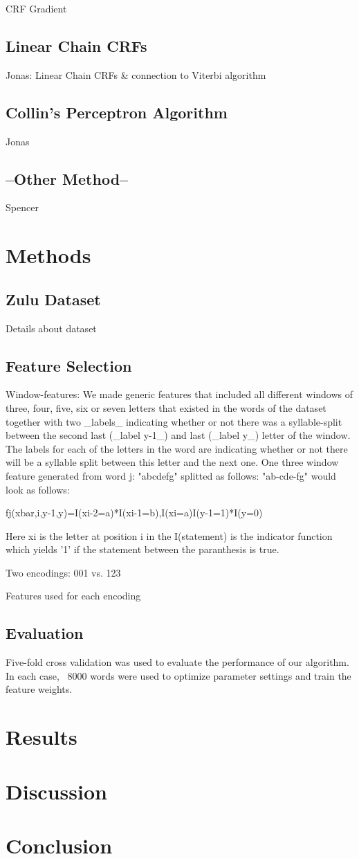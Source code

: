 \documentclass[10pt,twocolumn,letterpaper]{article}
\begin{document}
CRF Gradient

\subsection{Linear Chain CRFs}
Jonas: Linear Chain CRFs \& connection to Viterbi algorithm
\subsection{Collin's Perceptron Algorithm}
Jonas
\subsection{--Other Method--}
Spencer

\section{Methods}
\subsection{Zulu Dataset}
Details about dataset

\subsection{Feature Selection}
Window-features:
We made generic features that included all different windows of three, four, five, six or seven letters that existed in the words of the dataset together with two _labels_ indicating whether or not there was a syllable-split between the second last (_label y-1_) and last (_label y_) letter of the window. The labels for each of the letters in the word are indicating whether or not there will be a syllable split between this letter and the next one. One three window feature generated from word j: "abcdefg" splitted as follows: "ab-cde-fg" would look as follows:

fj(xbar,i,y-1,y)=I(xi-2=a)*I(xi-1=b),I(xi=a)I(y-1=1)*I(y=0)

Here xi is the letter at position i in the I(statement) is the indicator function which yields '1' if the statement between the paranthesis is true.


Two encodings: 001 vs. 123

Features used for each encoding

\subsection{Evaluation}
Five-fold cross validation was used to evaluate the performance of our algorithm.  In each case, ~8000 words were used to optimize parameter settings and train the feature weights. 



\section{Results}
\section{Discussion}
\section{Conclusion}



{\small


}
\end{document}

